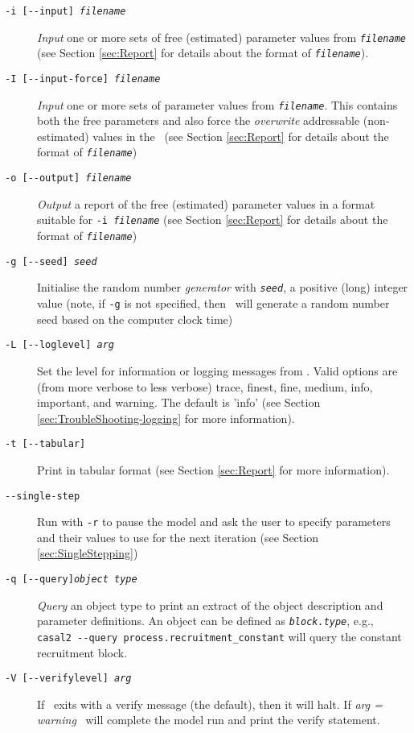 \begin{description}
\item [\texttt{-i [-{}-input] \emph{filename}}] \emph{Input} one or more sets of free (estimated) parameter values from \texttt{\emph{filename}} (see Section \ref{sec:Report} for details about the format of \texttt{\emph{filename}}).
\item [\texttt{-I [-{}-input-force] \emph{filename}}] \emph{Input} one or more sets of parameter values from \texttt{\emph{filename}}. This contains both the free parameters and also force the \emph{overwrite} addressable (non-estimated) values in the \config\ (see Section \ref{sec:Report} for details about the format of \texttt{\emph{filename}})
\item [\texttt{-o [-{}-output] \emph{filename}}] \emph{Output} a report of the free (estimated) parameter values in a format suitable for \texttt{-i \emph{filename}} (see Section \ref{sec:Report} for details about the format of \texttt{\emph{filename}})
\item [\texttt{-g [-{}-seed] \emph{seed}}] Initialise the random number \emph{generator} with \texttt{\emph{seed}}, a positive (long) integer value (note, if \texttt{-g} is not specified, then \CNAME\ will  generate a random number seed based on the computer clock time)
\item [\texttt{-L [-{}-loglevel] \emph{arg}}] Set the level for information or logging messages from \CNAME. Valid options are (from more verbose to less verbose) trace, finest, fine, medium, info, important, and warning. The default is 'info' (see Section \ref{sec:TroubleShooting-logging} for more information).
\item [\texttt{-t [-{}-tabular]}] Print  in tabular format (see Section \ref{sec:Report} for more information).
\item [\texttt{-{}-single-step}] Run with \texttt{-r} to pause the model and ask the user to specify parameters and their values to use for the next iteration (see Section \ref{sec:SingleStepping})
\item [\texttt{-q [-{}-query]\emph{object type}}] \emph{Query} an object type to print an extract of the object description and parameter definitions.  An object can be defined as \texttt{\emph{block.type}}, e.g., \texttt{casal2 -{}-query process.recruitment\_constant} will query the constant recruitment block.
\item [\texttt{-V [-{}-verifylevel] \emph{arg}}] If \CNAME\ exits with a verify message (the default), then it will halt. If \emph{arg = warning} \CNAME\ will complete the model run and print the verify statement.
\end{description}
